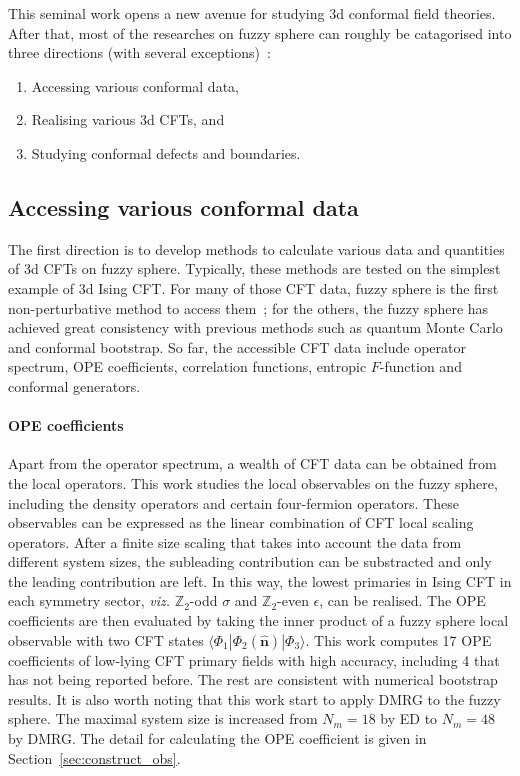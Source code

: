 \documentclass{timesjhep}
\begin{document}
This seminal work opens a new avenue for studying 3d conformal field theories. After that, most of the researches on fuzzy sphere can roughly be catagorised into three directions (with several exceptions)~: 

\begin{enumerate} 
    \item Accessing various conformal data, 
    \item Realising various 3d CFTs, and 
    \item Studying conformal defects and boundaries.
\end{enumerate} 

\subsection{Accessing various conformal data}

The first direction is to develop methods to calculate various data and quantities of 3d CFTs on fuzzy sphere. Typically, these methods are tested on the simplest example of 3d Ising CFT. For many of those CFT data, fuzzy sphere is the first non-perturbative method to access them~; for the others, the fuzzy sphere has achieved great consistency with previous methods such as quantum Monte Carlo and conformal bootstrap. So far, the accessible CFT data include operator spectrum, OPE coefficients, correlation functions, entropic $F$-function and conformal generators. 

\paragraph{OPE coefficients~\cite{Hu2023Mar}}

Apart from the operator spectrum, a wealth of CFT data can be obtained from the local operators. This work studies the local observables on the fuzzy sphere, including the density operators and certain four-fermion operators. These observables can be expressed as the linear combination of CFT local scaling operators. After a finite size scaling that takes into account the data from different system sizes, the subleading contribution can be substracted and only the leading contribution are left. In this way, the lowest primaries in Ising CFT in each symmetry sector, \textit{viz.} $\mathbb{Z}_2$-odd $\sigma$ and $\mathbb{Z}_2$-even $\epsilon$, can be realised. The OPE coefficients are then evaluated by taking the inner product of a fuzzy sphere local observable with two CFT states $\langle\Phi_1|\Phi_2(\hat{\mathbf{n}})|\Phi_3\rangle$. This work computes 17 OPE coefficients of low-lying CFT primary fields with high accuracy, including 4 that has not being reported before. The rest are consistent with numerical bootstrap results. It is also worth noting that this work start to apply DMRG to the fuzzy sphere. The maximal system size is increased from $N_m=18$ by ED to $N_m=48$ by DMRG. The detail for calculating the OPE coefficient is given in Section~\ref{sec:construct_obs}.
\end{document}
